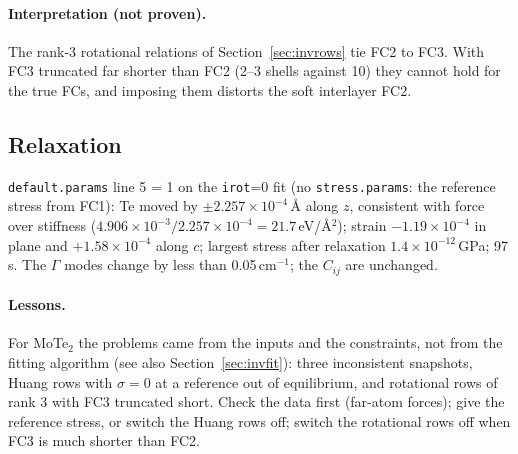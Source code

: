 \documentclass[11pt,a4paper]{article}
\newcommand{\code}[1]{\texttt{#1}}
\begin{document}
\paragraph{Interpretation (not proven).} The rank-3 rotational relations of Section~\ref{sec:invrows} tie FC2 to
FC3. With FC3 truncated far shorter than FC2 (2--3 shells against 10) they cannot hold for the true FCs, and
imposing them distorts the soft interlayer FC2.

\subsection{Relaxation}
\code{default.params} line 5 = 1 on the \code{irot}=0 fit (no \code{stress.params}: the reference stress from
FC1): Te moved by $\pm2.257\times10^{-4}$\,\AA{} along $z$, consistent with force over stiffness
($4.906\times10^{-3}/2.257\times10^{-4}=21.7$\,eV/\AA$^2$); strain $-1.19\times10^{-4}$ in plane and $+1.58\times10^{-4}$ along
$c$; largest stress after relaxation $1.4\times10^{-12}$\,GPa; 97\,s. The $\Gamma$ modes change by less than
0.05\,cm$^{-1}$; the $C_{ij}$ are unchanged.

\paragraph{Lessons.} For MoTe$_2$ the problems came from the inputs and the constraints, not from the fitting
algorithm (see also Section~\ref{sec:invfit}): three inconsistent snapshots, Huang rows with $\sigma=0$ at a reference out of equilibrium, and
rotational rows of rank 3 with FC3 truncated short. Check the data first (far-atom forces); give the reference
stress, or switch the Huang rows off; switch the rotational rows off when FC3 is much shorter than FC2.

\end{document}
